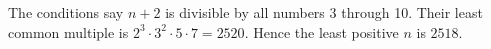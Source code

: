 The conditions say $n+2$ is divisible by all numbers 3 through 10. Their least common multiple is $2^3\cdot3^2\cdot5\cdot7=2520$. Hence the least positive $n$ is $\boxed{2518}$.
